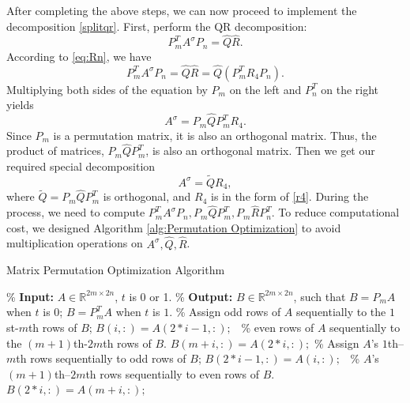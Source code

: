 \documentclass{book}
\makeatletter
\def\my@tag@font{\normalsize}
\let\amsmath@eqref\eqref
\renewcommand\eqref[1]{{\let\my@tag@font\relax\amsmath@eqref{#1}}}
\theoremstyle{remark}
\makeatother
\begin{document}
\begin{multicols}{2}
After completing the above steps, we can now proceed to implement the decomposition \eqref{splitqr}.
First, perform the QR decomposition:
\[P_m^TA^\sigma P_n = \widehat{Q}\widehat{R}.\]
According to \eqref{eq:Rn}, we have
\[P_m^TA^\sigma P_n = \widehat{Q}\widehat{R} = \widehat{Q}(P_m^TR_4P_n).\]
Multiplying both sides of the equation by $P_m$ on the left and $P_n^T$ on the right yields
\[A^\sigma=P_m\widehat{Q}P_m^T R_4.\]
 Since $P_m$ is a permutation matrix, it is also an orthogonal matrix. Thus, the product of matrices, $P_m\widehat{Q}P_m^T$, is also an orthogonal matrix. Then we get our required special decomposition \[A^\sigma=\widetilde{Q}R_4,\] where $\widetilde{Q}=P_m\widehat{Q}P_m^T$ is orthogonal, and $R_4$ is in the form of \eqref{r4}. During the process, we need to compute 
$P_m^TA^\sigma P_n, P_m\widehat{Q}P_m^T, P_m \widehat{R}P_n^T$. To reduce computational cost, we designed Algorithm \ref{alg:Permutation Optimization} to avoid multiplication operations on $A^\sigma, \widehat{Q}, \widehat{R}$.

\begin{algorithm}[htbp]
    \caption{Matrix Permutation Optimization Algorithm}
    \label{alg:Permutation Optimization}
    \begin{algorithmic}[1]
        \State \% \textbf{Input:} $ A\in \mathbb{R}^{2m\times 2n}$, $t$ is 0 or 1.
        \State \% \textbf{Output:} $B \in\mathbb{R}^{2m\times 2n}$, such that $B=P_mA$ when $t$ is $0$;  $B=P_m^TA$ when $t$ is $1$.
           \qquad\qquad\qquad\qquad \% 
          Assign odd rows of $A$ sequentially to the $1$st-$m$th rows of $B$; 
            \State $B(i, :) = A(2*i-1, :);$
            \qquad\ \% even rows of $A$ sequentially to the $(m+1)$th-$2m$th rows of $B$.
            \State $B(m+i, :) = A(2*i, :);$
          \End
        \Else  
             \qquad\qquad\qquad\qquad \% 
            Assign $A$'s $1$th--$m$th rows sequentially to odd rows of $B$;
            \State $B(2*i-1, :) = A(i, :);$ \qquad\ \%  $A$'s $(m+1)$th--$2m$th rows sequentially to even rows of $B$.
            \State $B(2*i, :) = A(m+i, :);$
          \End
        \End
    \End 
    \end{algorithmic}
\end{algorithm}


\end{multicols}
\end{document}
